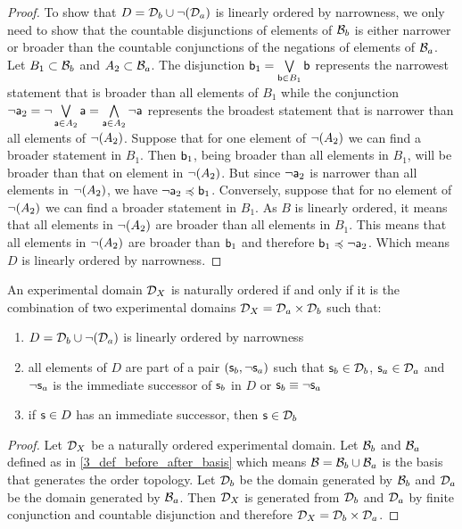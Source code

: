 \documentclass[11pt,letterpaper,fleqn]{memoir} %
\begin{document}
\begin{mathSection}
\begin{proof}
	To show that $D=\edomain_b \cup \NOT (\edomain_a)$ is linearly ordered by narrowness, we only need to show that the countable disjunctions of elements of $\basis_b$ is either narrower or broader than the countable conjunctions of the negations of elements of $\basis_a$. Let $B_1 \subset \basis_b$ and $A_2 \subset \basis_a$. The disjunction $\stmt[b]_1 = \bigOR\limits_{\stmt[b] \in B_1} \stmt[b]$ represents the narrowest statement that is broader than all elements of $B_1$ while the conjunction $\NOT \stmt[a]_2 = \NOT \bigOR\limits_{\stmt[a] \in A_2} \stmt[a] = \bigAND\limits_{\stmt[a] \in A_2} \NOT \stmt[a]$ represents the broadest statement that is narrower than all elements of $\NOT(A_2)$. Suppose that for one element of $\NOT(A_2)$ we can find a broader statement in $B_1$. Then $\stmt[b]_1$, being broader than all elements in $B_1$, will be broader than that on element in $\NOT(A_2)$. But since $\NOT \stmt[a]_2$ is narrower than all elements in $\NOT(A_2)$, we have $\NOT \stmt[a]_2 \narrower \stmt[b]_1$. Conversely, suppose that for no element of $\NOT(A_2)$ we can find a broader statement in $B_1$. As $B$ is linearly ordered, it means that all elements in $\NOT(A_2)$ are broader than all elements in $B_1$. This means that all elements in $\NOT(A_2)$ are broader than $\stmt[b]_1$ and therefore $\stmt[b]_1 \narrower \NOT \stmt[a]_2$. Which means $D$ is linearly ordered by narrowness.
\end{proof}

\begin{thrm}\label{3_thrm_domain_ordering_theorem}
	An experimental domain $\edomain_X$ is naturally ordered if and only if it is the combination of two experimental domains $\edomain_X = \edomain_a \times \edomain_b$ such that:
	\begin{enumerate}[label=(\roman*)]
		\item $D = \edomain_b \cup \NOT(\edomain_a)$ is linearly ordered by narrowness
		\item all elements of $D$ are part of a pair $(\stmt_b, \NOT \stmt_a)$ such that $\stmt_b \in \edomain_b$, $\stmt_a \in \edomain_a$ and $\NOT \stmt_a$ is the immediate successor of $\stmt_b$ in $D$ or $\stmt_b \equiv \NOT \stmt_a$
		\item if $\stmt \in D$ has an immediate successor, then $\stmt \in \edomain_b$
	\end{enumerate}
\end{thrm}

\begin{proof}
	Let $\edomain_X$ be a naturally ordered experimental domain. Let $\basis_b$ and $\basis_a$ defined as in \ref{3_def_before_after_basis} which means $\basis = \basis_b \cup \basis_a$ is the basis that generates the order topology. Let $\edomain_b$ be the domain generated by $\basis_b$ and $\edomain_a$ be the domain generated by $\basis_a$. Then $\edomain_X$ is generated from $\edomain_b$ and $\edomain_a$ by finite conjunction and countable disjunction and therefore $\edomain_X = \edomain_b \times \edomain_a$.
	

\end{proof}
\end{mathSection}
\end{document}
